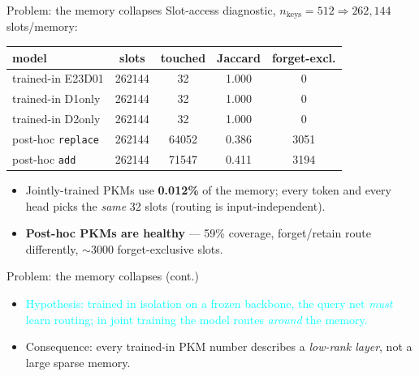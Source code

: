 \documentclass{beamer}
\newcommand{\pierre}[1]{\textcolor{cyan}{#1}}
\begin{document}
\begin{frame}{\alert{Problem: the memory collapses}}
Slot-access diagnostic, $n_{\text{keys}}=512 \Rightarrow 262{,}144$ slots/memory:
\begin{center}
\begin{tabular}{|l|c|c|c|c|}
\hline
model & slots & touched & Jaccard & forget-excl. \\
\hline
trained-in E23D01 & 262144 & \alert{32} & \alert{1.000} & \alert{0} \\
trained-in D1only & 262144 & \alert{32} & \alert{1.000} & \alert{0} \\
trained-in D2only & 262144 & \alert{32} & \alert{1.000} & \alert{0} \\
post-hoc \texttt{replace} & 262144 & 64052 & 0.386 & 3051 \\
post-hoc \texttt{add}     & 262144 & 71547 & 0.411 & 3194 \\
\hline
\end{tabular}
\end{center}

\begin{itemize}
  \item Jointly-trained PKMs use \textbf{0.012\%} of the memory; every token and
        every head picks the \emph{same} 32 slots (routing is input-independent).
  \item \textbf{Post-hoc PKMs are healthy} --- 59\% coverage, forget/retain route
        differently, $\sim$3000 forget-exclusive slots.
\end{itemize}
\end{frame}

\begin{frame}{\alert{Problem: the memory collapses} (cont.)}
\begin{itemize}
  \item \pierre{Hypothesis: trained in isolation on a frozen backbone, the query
        net \emph{must} learn routing; in joint training the model routes
        \emph{around} the memory.}
  \item Consequence: every trained-in PKM number describes a \emph{low-rank
        layer}, not a large sparse memory.
\end{itemize}
\end{frame}
\end{document}
